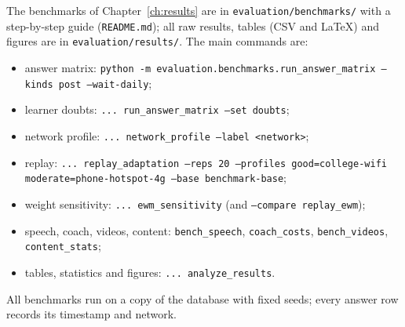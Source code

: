 The benchmarks of Chapter~\ref{ch:results} are in \texttt{evaluation/benchmarks/} with a step-by-step
guide (\texttt{README.md}); all raw results, tables (CSV and \LaTeX) and figures are in
\texttt{evaluation/results/}. The main commands are:
\begin{itemize}
  \item answer matrix: \texttt{python -m evaluation.benchmarks.run\_answer\_matrix --kinds post --wait-daily};
  \item learner doubts: \texttt{... run\_answer\_matrix --set doubts};
  \item network profile: \texttt{... network\_profile --label <network>};
  \item replay: \texttt{... replay\_adaptation --reps 20 --profiles good=college-wifi moderate=phone-hotspot-4g
    --base benchmark-base};
  \item weight sensitivity: \texttt{... ewm\_sensitivity} (and \texttt{--compare replay\_ewm});
  \item speech, coach, videos, content: \texttt{bench\_speech}, \texttt{coach\_costs}, \texttt{bench\_videos},
    \texttt{content\_stats};
  \item tables, statistics and figures: \texttt{... analyze\_results}.
\end{itemize}
All benchmarks run on a copy of the database with fixed seeds; every answer row records its timestamp and
network.
